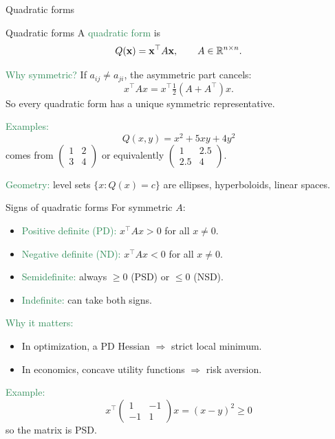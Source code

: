 \documentclass{beamer}
\begin{document}
\begin{frame} \begin{center}
	\alert{\Huge Quadratic forms}
\end{center}\end{frame}


\begin{frame}{Quadratic forms}
A \textcolor{SeaGreen}{quadratic form} is
\[
Q(\mathbf{x}) = \mathbf{x}^\top A \mathbf{x}, \qquad A \in \mathbb R^{n\times n}.
\]

\medskip
\textcolor{SeaGreen}{Why symmetric?}  
If $a_{ij}\neq a_{ji}$, the asymmetric part cancels:
\[
x^\top A x = x^\top \tfrac{1}{2}(A+A^\top)x.
\]
So every quadratic form has a unique symmetric representative.

\medskip
\textcolor{SeaGreen}{Examples:}
\[
Q(x,y) = x^2+5xy+4y^2
\]
comes from
$\begin{pmatrix}1&2\\3&4\end{pmatrix}$
or equivalently
$\begin{pmatrix}1&2.5\\2.5&4\end{pmatrix}$.

\medskip
\textcolor{SeaGreen}{Geometry:} level sets $\{x:Q(x)=c\}$ are ellipses, hyperboloids, linear spaces.
\end{frame}




\begin{frame}{Signs of quadratic forms}
For symmetric $A$:
\begin{itemize}
\item \textcolor{SeaGreen}{Positive definite (PD):} $x^\top A x > 0$ for all $x\neq 0$.
\item \textcolor{SeaGreen}{Negative definite (ND):} $x^\top A x < 0$ for all $x\neq 0$.
\item \textcolor{SeaGreen}{Semidefinite:} always $\ge 0$ (PSD) or $\le 0$ (NSD).
\item \textcolor{SeaGreen}{Indefinite:} can take both signs.
\end{itemize}

\medskip
\textcolor{SeaGreen}{Why it matters:}
\begin{itemize}
\item In optimization, a PD Hessian $\Rightarrow$ strict local minimum.  
\item In economics, concave utility functions $\Rightarrow$ risk aversion.  
\end{itemize}

\medskip
\textcolor{SeaGreen}{Example:}
\[
x^\top
\begin{pmatrix}1&-1\\-1&1\end{pmatrix}
x = (x-y)^2 \ge 0
\]
so the matrix is PSD.
\end{frame}
\end{document}
